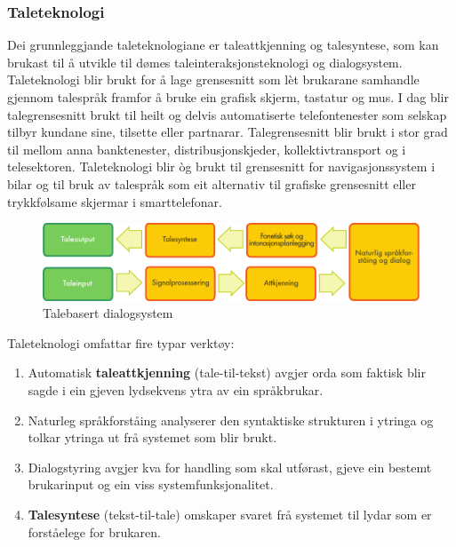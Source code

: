 \begin{multicols}{2}
\subsubsection{Taleteknologi}

Dei grunnleggjande taleteknologiane er taleattkjenning og talesyntese, som kan brukast til å utvikle til dømes taleinteraksjonsteknologi og dialogsystem. Taleteknologi blir brukt for å lage grensesnitt som lèt brukarane samhandle gjennom talespråk framfor å bruke ein grafisk skjerm, tastatur og mus. I dag blir talegrensesnitt brukt til heilt og delvis automatiserte telefontenester som selskap tilbyr kundane sine, tilsette eller partnarar. Talegrensesnitt blir brukt i stor grad til mellom anna banktenester, distribusjonskjeder, kollektivtransport og i telesektoren. Taleteknologi blir òg brukt til grensesnitt for navigasjonssystem i bilar og til bruk av talespråk som eit alternativ til grafiske grensesnitt eller trykkfølsame skjermar i smarttelefonar. 

\begin{figure}[htb]
 \center
 \includegraphics[width=\textwidth]{../_media/norwegian-nynorsk/simple_speech-based_dialogue_architecture}
 \caption{Talebasert dialogsystem}
 \label{fig:dialoguearch_no}
\end{figure}

Taleteknologi omfattar fire typar verktøy: 

\begin{enumerate}
\item Automatisk \textbf{taleattkjenning} (tale-til-tekst) avgjer orda
  som faktisk blir sagde i ein gjeven lydsekvens ytra av ein
  språkbrukar.
\columnbreak

\item Naturleg språkforståing analyserer den syntaktiske strukturen i ytringa og tolkar ytringa ut frå systemet som blir brukt.
\item Dialogstyring avgjer kva for handling som skal utførast, gjeve ein bestemt brukarinput og ein viss systemfunksjonalitet.
\item \textbf{Talesyntese} (tekst-til-tale) omskaper svaret frå systemet til lydar som er forståelege for brukaren.
\end{enumerate}


\end{multicols}
